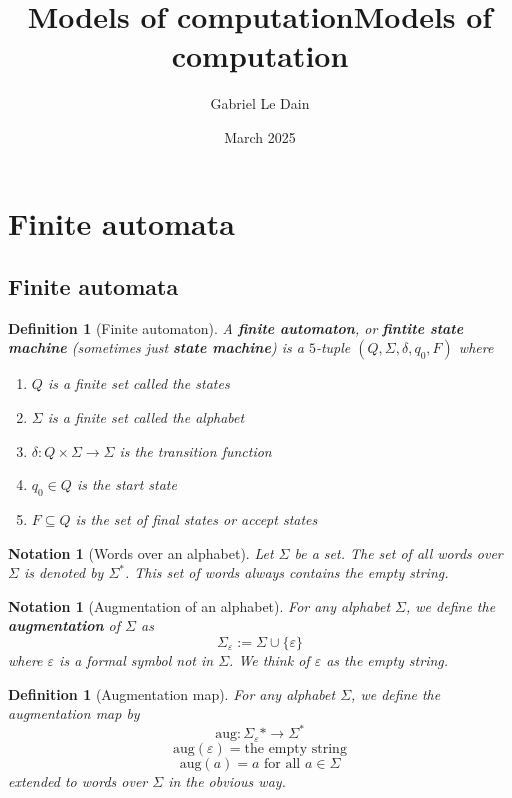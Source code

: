 \documentclass{article}
\title{Models of computation}
\author{Gabriel Le Dain}
\date{March 2025}
\theoremstyle{break}
\newtheorem{notation}[theorem]{Notation}
\newtheorem{definition}[theorem]{Definition}
\begin{document}
\title{Models of computation}
\maketitle

\section{Finite automata}

\subsection{Finite automata}
\begin{definition}[Finite automaton]
\label{def:finite-automaton}
A \textbf{finite automaton}, or \textbf{fintite state machine} (sometimes just \textbf{state machine}) is a $5$-tuple $(Q,\Sigma,\delta,q_0,F)$ where
\begin{enumerate}
    \item $Q$ is a finite set called the \textit{states}
    \item $\Sigma$ is a finite set called the \textit{alphabet}
    \item $\delta: Q\times\Sigma \to \Sigma$ is the \textit{transition function}
    \item $q_0\in Q$ is the \textit{start state}
    \item $F \subseteq Q$ is the set of \textit{final states} or \textit{accept states} 
\end{enumerate}
\end{definition}

\begin{notation}[Words over an alphabet]
\label{not:words}
Let $\Sigma$ be a set. The set of all words over $\Sigma$ is denoted by $\Sigma^*$.
This set of words always contains the empty string.
\end{notation}

\begin{notation}[Augmentation of an alphabet]
\label{not:augmentation}
For any alphabet $\Sigma$, we define the \textbf{augmentation} of $\Sigma$ as
\[\Sigma_{\varepsilon} := \Sigma \cup \{\varepsilon\}\]
where $\varepsilon$ is a formal symbol not in $\Sigma$.
We think of $\varepsilon$ as the empty string.
\end{notation}

\begin{definition}[Augmentation map]
\label{def:augmentation-map}
For any alphabet $\Sigma$, we define the augmentation map by
\[\textrm{aug}: \Sigma_{\varepsilon}* \to \Sigma^*\]
\[\textrm{aug}(\varepsilon) = \text{the empty string}\]
\[\textrm{aug}(a) = a \text{ for all } a\in \Sigma \]
extended to words over $\Sigma$ in the obvious way.
\end{definition}
\end{document}
